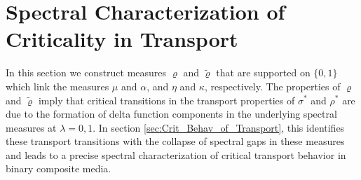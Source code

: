 \documentclass[english,12pt,jmp,graphicx]{revtex4-1}
\begin{document}
\section{Spectral Characterization of Criticality in
  Transport} \label{sec:Measure_Equivalences}   
%
In this section we construct measures $\varrho$ and $\tilde{\varrho}$ that are
supported on $\{0,1\}$ which link the measures $\mu$ and $\alpha$, and $\eta$ and
$\kappa$, respectively. The properties of $\varrho$ and $\tilde{\varrho}$ imply that
critical transitions in the transport properties of $\sigma^*$ and $\rho^*$
are due to the formation of delta function components in the
underlying spectral measures at $\lambda=0,1$. In section
\ref{sec:Crit_Behav_of_Transport}, this identifies these transport
transitions with the collapse of spectral gaps in these measures and
leads to a precise spectral characterization of critical transport
behavior in binary composite media. 
%
\end{document}
